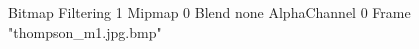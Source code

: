 {Bitmap
	{Filtering 1}
	{Mipmap 0}
	{Blend none}
	{AlphaChannel 0}
	{Frame "thompson_m1.jpg.bmp"}
}
